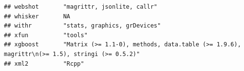 \documentclass[]{article}
\begin{document}
\begin{verbatim}
## webshot       "magrittr, jsonlite, callr"                                                                                                                                                                                                                                                                                                                                                                                                                                                           
## whisker       NA                                                                                                                                                                                                                                                                                                                                                                                                                                                                                    
## withr         "stats, graphics, grDevices"                                                                                                                                                                                                                                                                                                                                                                                                                                                          
## xfun          "tools"                                                                                                                                                                                                                                                                                                                                                                                                                                                                               
## xgboost       "Matrix (>= 1.1-0), methods, data.table (>= 1.9.6), magrittr\n(>= 1.5), stringi (>= 0.5.2)"                                                                                                                                                                                                                                                                                                                                                                                           
## xml2          "Rcpp"                                                                                                                                                                                                                                                                                                                                                                                                                                                                                

\end{verbatim}
\end{document}
